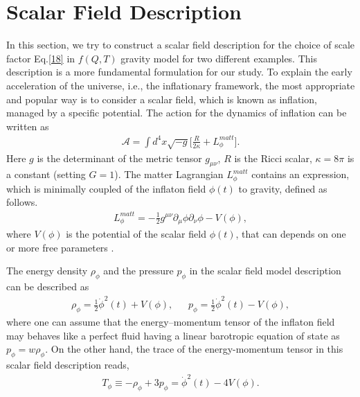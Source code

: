 \documentclass[aps,prd,showpacs,nofootinbib,floats,floatfix,preprintnumbers,groupedaddress,twocolumn]{revtex4-1}
\def \m{\mu}
\def \n{\nu}
\def \ben{\begin{eqnarray}}
\def \een{\end{eqnarray}}
\def \p{\partial}
\def \r{\rho}
\begin{document}
    
\section{Scalar Field Description}\label{VII}
\noindent
    In this section, we try to construct a scalar field description for the choice of scale factor Eq.\eqref{18} in $f(Q,T)$ gravity model for two different examples. This description is a more fundamental formulation for our study. To explain the early acceleration of the universe, i.e., the inflationary framework, the most appropriate and popular way is to consider a scalar field, which is known as inflation, managed by a specific potential. The action for the dynamics of inflation can be written as
\ben
    \mathcal{A}=\int d^4 x \sqrt{-g}\Big[\frac{R}{2\kappa}+L^{matt}_{\phi}\Big].
    \label{33}
\een
    Here $g$ is the determinant of the metric tensor $g_{\m\n}$, $R$ is the Ricci scalar, $\kappa=8\pi$ is a constant (setting $G=1$). The matter Lagrangian $L^{matt}_{\phi}$ contains an expression, which is minimally coupled of the inflaton field $\phi(t)$ to gravity, defined as follows.
\ben
    L^{matt}_{\phi}=-\frac{1}{2}g^{\m\n}\p_\m \phi\p_\n \phi -V(\phi),
    \label{34}
\een
    where $V(\phi)$ is the potential of the scalar field $\phi(t)$, that can depends on one or more free parameters \cite{Lyth}.

    The energy density $\r_{\phi}$ and the pressure $p_{\phi}$ in the scalar field model description can be described as
\ben
    \r_{\phi}=\frac{1}{2}{\dot{\phi}}^2(t)+V(\phi),~~~~~~~p_{\phi}=\frac{1}{2}{\dot{\phi}}^2(t)-V(\phi),\label{35}
\een
    where one can assume that the energy–momentum tensor of the inflaton field may behaves like a perfect fluid having a linear barotropic equation of state as $p_{\phi}=w\r_{\phi}$. On the other hand, the trace of the energy-momentum tensor in this scalar field description reads,
\ben
    T_{\phi}\equiv -\r_{\phi}+3p_{\phi}={\dot{\phi}}^2(t)-4V(\phi).\label{36}
\een
    
\end{document}
